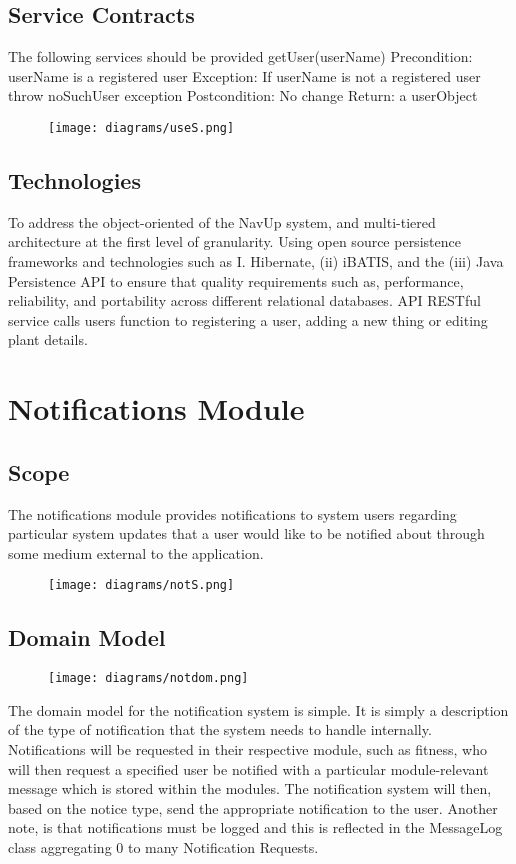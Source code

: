 \documentclass[12pt]{article}
\begin{document}
\subsection{Service Contracts}
The following services should be provided
getUser(userName)
Precondition: userName is a registered user
Exception: If userName is not a registered user throw noSuchUser exception
Postcondition: No change
Return: a userObject

\begin{figure}
\centering
\texttt{[image: diagrams/useS.png]}
\end{figure}
\subsection{Technologies}
To address the object-oriented of the NavUp system, and multi-tiered architecture at the first level of granularity.  Using open source persistence frameworks and technologies such as 
I.    Hibernate, (ii) iBATIS, and the (iii) Java Persistence API to ensure that quality requirements such as, performance, reliability, and portability across different relational databases.  API RESTful service calls users function to registering a user, adding a new thing or editing
plant details.

\section{Notifications Module}
\subsection{Scope}
The notifications module provides notifications to system users regarding particular system updates that a user would like to be notified about through some medium external to the application.

\begin{figure}[h]
\centering
\texttt{[image: diagrams/notS.png]}
\end{figure}
\subsection{Domain Model}
\begin{figure}[h]
\centering
\texttt{[image: diagrams/notdom.png]}
\end{figure}
The domain model for the notification system is simple. It is simply a description of the type of notification that the system needs to handle internally. Notifications will be requested in their respective module, such as fitness, who will then request a specified user be notified with a particular module-relevant message which is stored within the modules. The notification system will then, based on the notice type, send the appropriate notification to the user. Another note, is that notifications must be logged and this is reflected in the MessageLog class aggregating 0 to many Notification Requests.
\end{document}
